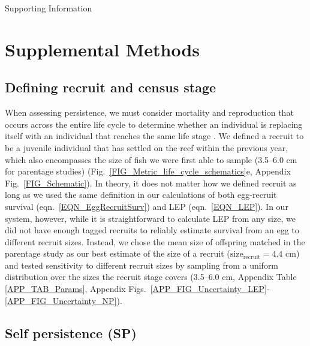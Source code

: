 \documentclass[12pt, oneside]{article}   	%
\begin{document}
{\LARGE Supporting Information}

\appendix

\renewcommand{\theequation}{A\arabic{equation}}
\renewcommand{\thetable}{A\arabic{table}}
\setcounter{equation}{0}  %
\setcounter{figure}{0}
\setcounter{table}{0}

\section{Supplemental Methods} \label{APP_SUPP_METHODS}

\subsection{Defining recruit and census stage} \label{APP_SEC_METHODS_Recruit_def}

When assessing persistence, we must consider mortality and reproduction that occurs across the entire life cycle to determine whether an individual is replacing itself with an individual that reaches the same life stage \citep{burgess2014beyond}. We defined a recruit to be a juvenile individual that has settled on the reef within the previous year, which also encompasses the size of fish we were first able to sample (3.5--6.0 cm for parentage studies) (Fig.\ \ref{FIG_Metric_life_cycle_schematics}e, Appendix Fig.\ \ref{FIG_Schematic}). In theory, it does not matter how we defined recruit as long as we used the same definition in our calculations of both egg-recruit survival (eqn.\ \ref{EQN_EggRecruitSurv}) and LEP (eqn.\ \ref{EQN_LEP}). In our system, however, while it is straightforward to calculate LEP from any size, we did not have enough tagged recruits to reliably estimate survival from an egg to different recruit sizes. Instead, we chose the mean size of offspring matched in the parentage study as our best estimate of the size of a recruit ($\text{size}_\text{recruit} = 4.4$ cm) and tested sensitivity to different recruit sizes by sampling from a uniform distribution over the sizes the recruit stage covers (3.5--6.0 cm, Appendix Table \ref{APP_TAB_Params}, Appendix Figs.\ \ref{APP_FIG_Uncertainty_LEP}-\ref{APP_FIG_Uncertainty_NP}).

\subsection{Self persistence (SP)} \label{APP_SEC_METHODS_SP}
\end{document}
